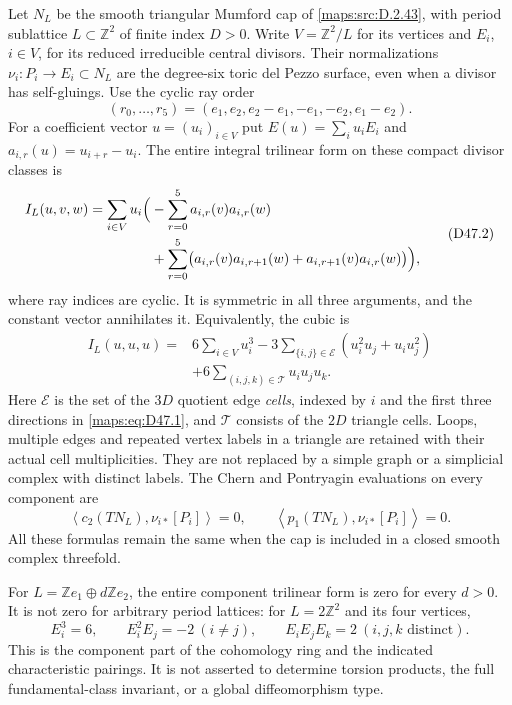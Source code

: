 \begin{theorem}
Let $N_L$ be the smooth triangular Mumford cap of \ref{maps:src:D.2.43},
with period sublattice $L\subset\mathbb Z^2$ of finite index
$D>0$. Write $V=\mathbb Z^2/L$ for its vertices and
$E_i$, $i\in V$, for its reduced irreducible central divisors.
Their normalizations $\nu_i:P_i\to E_i\subset N_L$ are the
degree-six toric del Pezzo surface, even when a divisor has
self-gluings. Use the cyclic ray order
\[
 (r_0,\ldots,r_5)=
       (e_1,e_2,e_2-e_1,-e_1,-e_2,e_1-e_2).                 \tag{D47.1}\label{maps:eq:D47.1}
\]
For a coefficient vector $u=(u_i)_{i\in V}$ put
$E(u)=\sum_i u_iE_i$ and
$a_{i,r}(u)=u_{i+r}-u_i$. The entire integral trilinear
form on these compact divisor classes is
\[
\begin{split}
 I_L(u,v,w)=\sum_{i\in V}u_i\Bigl(
 &-\sum_{r=0}^5 a_{i,r}(v)a_{i,r}(w)\\
 &+\sum_{r=0}^5\bigl(a_{i,r}(v)a_{i,r+1}(w)
                    +a_{i,r+1}(v)a_{i,r}(w)\bigr)\Bigr),
\end{split}                                                   \tag{D47.2}\label{maps:eq:D47.2}
\]
where ray indices are cyclic. It is symmetric in all three
arguments, and the constant vector annihilates it.
Equivalently, the cubic is
\[
\begin{split}
 I_L(u,u,u)={}&6\sum_{i\in V}u_i^3
       -3\sum_{\{i,j\}\in\mathcal E}
                      (u_i^2u_j+u_iu_j^2)\\
       &+6\sum_{(i,j,k)\in\mathcal T}u_iu_ju_k.
\end{split}                                                   \tag{D47.3}\label{maps:eq:D47.3}
\]
Here $\mathcal E$ is the set of the $3D$ quotient edge
\emph{cells}, indexed by $i$ and the first three directions
in \eqref{maps:eq:D47.1}, and $\mathcal T$ consists of the $2D$ triangle
cells. Loops, multiple edges and repeated vertex labels in
a triangle are retained with their actual cell multiplicities.
They are not replaced by a simple graph or a simplicial
complex with distinct labels.
The Chern and Pontryagin evaluations on every component are
\[
 \left\langle c_2(TN_L),\nu_{i*}[P_i]\right\rangle=0,
 \qquad
 \left\langle p_1(TN_L),\nu_{i*}[P_i]\right\rangle=0.         \tag{D47.4}\label{maps:eq:D47.4}
\]
All these formulas remain the same when the cap is included
in a closed smooth complex threefold.

For $L=\mathbb Ze_1\oplus d\mathbb Ze_2$, the entire
component trilinear form is zero for every $d>0$.
It is not zero for arbitrary period lattices: for
$L=2\mathbb Z^2$ and its four vertices,
\[
 E_i^3=6,\qquad E_i^2E_j=-2\ (i\ne j),\qquad
 E_iE_jE_k=2\ (i,j,k\text{ distinct}).                      \tag{D47.5}\label{maps:eq:D47.5}
\]
This is the component part of the cohomology ring and
the indicated characteristic pairings. It is not asserted
to determine torsion products, the full fundamental-class
invariant, or a global diffeomorphism type.

\end{theorem}
